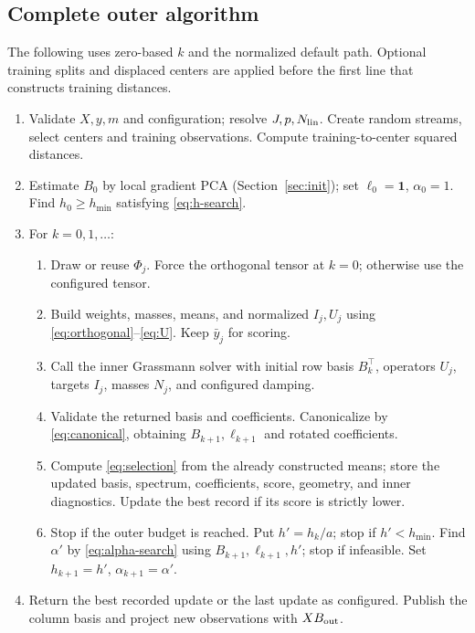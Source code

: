 \documentclass[11pt,a4paper]{article}
\begin{document}
\subsection{Complete outer algorithm}
The following uses zero-based $k$ and the normalized default path. Optional
training splits and displaced centers are applied before the first line
that constructs training distances.
\begin{enumerate}[label=\arabic*.,leftmargin=*]
\item Validate $X,y,m$ and configuration; resolve $J,p,N_{\rm lin}$.
Create random streams, select centers and training observations.
Compute training-to-center squared distances.
\item Estimate $B_0$ by local gradient PCA
(Section~\ref{sec:init}); set $\ell_0=\bm1$, $\alpha_0=1$.
Find $h_0\ge h_{\min}$ satisfying \eqref{eq:h-search}.
\item For $k=0,1,\ldots$:
\begin{enumerate}[label=(\alph*),leftmargin=*]
\item Draw or reuse $\Phi_j$. Force the orthogonal tensor at $k=0$;
otherwise use the configured tensor.
\item Build weights, masses, means, and normalized $I_j,U_j$ using
\eqref{eq:orthogonal}--\eqref{eq:U}. Keep $\bar y_j$ for scoring.
\item Call the inner Grassmann solver with initial row basis $B_k^\top$,
operators $U_j$, targets $I_j$, masses $N_j$, and configured damping.
\item Validate the returned basis and coefficients. Canonicalize by
\eqref{eq:canonical}, obtaining $B_{k+1},\ell_{k+1}$ and rotated coefficients.
\item Compute \eqref{eq:selection} from the already constructed means;
store the updated basis, spectrum, coefficients, score, geometry, and
inner diagnostics. Update the best record if its score is strictly lower.
\item Stop if the outer budget is reached. Put $h'=h_k/a$; stop if
$h'<h_{\min}$. Find $\alpha'$ by \eqref{eq:alpha-search} using
$B_{k+1},\ell_{k+1},h'$; stop if infeasible. Set
$h_{k+1}=h'$, $\alpha_{k+1}=\alpha'$.
\end{enumerate}
\item Return the best recorded update or the last update as configured.
Publish the column basis and project new observations with $XB_{\rm out}$.
\end{enumerate}
\end{document}
